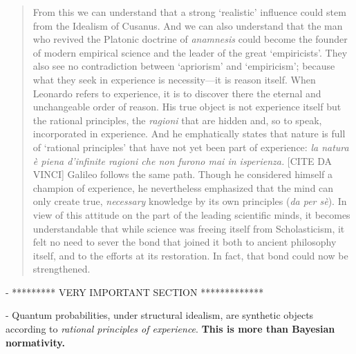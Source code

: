 \begin{quote}
    From this we can understand that a strong `realistic' influence could stem from the Idealism of Cusanus.  And we can also understand that the man who revived the Platonic doctrine of \emph{anamnesis} could become the founder of modern empirical science and the leader of the great `empiricists'.  They also see no contradiction between `apriorism' and `empiricism'; because what they seek in experience is necessity---it is reason itself.  When Leonardo refers to experience, it is to discover there the eternal and unchangeable order of reason.  His true object is not experience itself but the rational principles, the \emph{ragioni} that are hidden and, so to speak, incorporated in experience.  And he emphatically states that nature is full of `rational principles' that have not yet been part of experience: \emph{la natura \`e piena d'infinite ragioni che non furono mai in isperienza.} [CITE DA VINCI]  Galileo follows the same path.  Though he considered himself a champion of experience, he nevertheless emphasized that the mind can only create true, \emph{necessary} knowledge by its own principles (\emph{da per s\`e}).  In view of this attitude on the part of the leading scientific minds, it becomes understandable that while science was freeing itself from Scholasticism, it felt no need to sever the bond that joined it both to ancient philosophy itself, and to the efforts at its restoration.  In fact, that bond could now be strengthened. 

    \citep[p. 56-58]{Cassirer1927}
\end{quote}

- ********* VERY IMPORTANT SECTION ************* 

- Quantum probabilities, under structural idealism, are synthetic objects according to \emph{rational principles of experience}.  \textbf{This is more than Bayesian normativity.}



